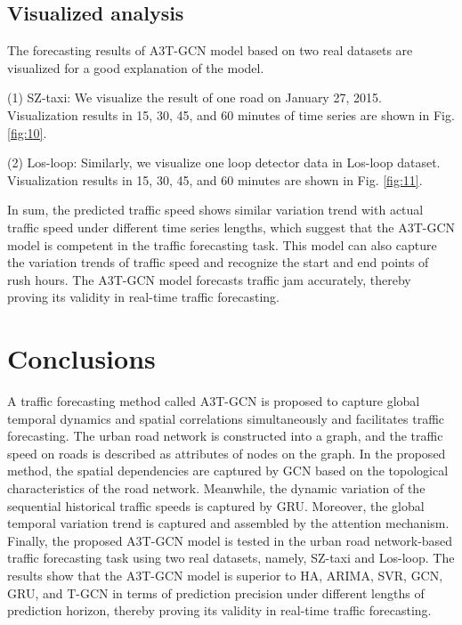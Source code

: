 \documentclass[10pt,journal,compsoc]{IEEEtran}
\begin{document}
\subsection{Visualized analysis}
\par The forecasting results of A3T-GCN model based on two real datasets are visualized for a good explanation of the model.
\par (1) SZ-taxi: We visualize the result of one road on January 27, 2015. Visualization results in 15, 30, 45, and 60 minutes of time series are shown in Fig. \ref{fig:10}.
\par (2) Los-loop: Similarly, we visualize one loop detector data in Los-loop dataset. Visualization results in 15, 30, 45, and 60 minutes are shown in Fig. \ref{fig:11}.
\par In sum, the predicted traffic speed shows similar variation trend with actual traffic speed under different time series lengths, which suggest that the A3T-GCN model is competent in the traffic forecasting task. This model can also capture the variation trends of traffic speed and recognize the start and end points of rush hours. The A3T-GCN model forecasts traffic jam accurately, thereby proving its validity in real-time traffic forecasting.

\section{Conclusions}
\par A traffic forecasting method called A3T-GCN is proposed to capture global temporal dynamics and spatial correlations simultaneously and facilitates traffic forecasting. The urban road network is constructed into a graph, and the traffic speed on roads is described as attributes of nodes on the graph. In the proposed method, the spatial dependencies are captured by GCN based on the topological characteristics of the road network. Meanwhile, the dynamic variation of the sequential historical traffic speeds is captured by GRU. Moreover, the global temporal variation trend is captured and assembled by the attention mechanism. Finally, the proposed A3T-GCN model is tested in the urban road network-based traffic forecasting task using two real datasets, namely, SZ-taxi and Los-loop. The results show that the A3T-GCN model is superior to HA, ARIMA, SVR, GCN, GRU, and T-GCN in terms of prediction precision under different lengths of prediction horizon, thereby proving its validity in real-time traffic forecasting. 
\end{document}
